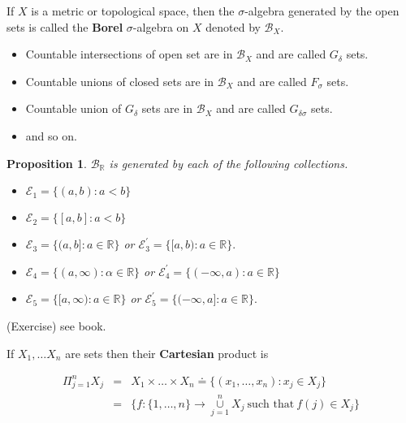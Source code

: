 \documentclass[12pt]{report}
\newtheorem{prop}[theorem]{Proposition}
\begin{document}
\vspace{.15cm} 
\noindent If $X$ is a metric or topological space, then the
$\sigma$-algebra generated by the open sets is called the  {\bf Borel}
$\sigma$-algebra on $X$ denoted by
$\mathcal{B}_X$.

\begin{itemize}
\item  Countable intersections of open set are in
$\mathcal{B}_X$ and are called
$G_\delta$ sets.
\item  Countable unions of closed sets  are in
$\mathcal{B}_X$ and are called $F_\sigma$ sets.
\item Countable union of $G_\delta$ sets are in
$\mathcal{B}_X$ and are called $G_{\delta
\sigma}$ sets.
\item  and so on.
\end{itemize}

\begin{prop} $\mathcal{B}_{\mathbb{R}}$ is generated by each of the
following collections.
\begin{itemize}
\item[1.]  $\mathcal{E}_1 = \{(a, b) : a< b \}$
\item[2.]  $\mathcal{E}_2 = \{[a, b]: a < b\}$
\item[3.] $\mathcal{E}_3 = \{(a, b]: a \in \mathbb{R}\}$ or
$\mathcal{E}^\prime_3 =
\{[a, b): a \in \mathbb{R}\}.$
\item[4.]  $\mathcal{E}_4 = \{(a, \infty): \alpha \in \mathbb{R}\}$ or
$\mathcal{E}^\prime_4 = \{(- \infty, a): a \in \mathbb{R}\}$
\item[5.]  $\mathcal{E}_5 = \{[a, \infty): a \in \mathbb{R}\}$ or
$\mathcal{E}^\prime_5 = \{(- \infty, a]: a \in \mathbb{R}\}.$
\end{itemize}
\end{prop}

\vspace{.25cm}
  (Exercise) see book.


\vspace{.25cm}
  If $X_1, \dots X_n$ are sets then 
their {\bf Cartesian} product is 

\begin{eqnarray*}
\Pi^n_{j=1} X_j &=& X_1 \times \dots \times X_n \doteq \{(x_1,
\dots, x_n): x_j
\in X_j\}\\  &=& \{f: \{1, \dots, n\} \longrightarrow
\overset{n}{\underset{j=1}{\cup}}
 X_j\ \text{such that}\  f(j) \in X_j \}
\end{eqnarray*}
\end{document}
